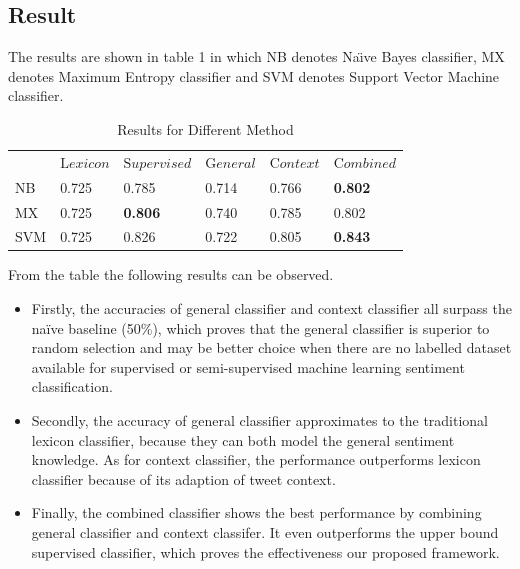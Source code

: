 \documentclass{llncs}
\begin{document}
\subsection{Result}
The results are shown in table 1 in which NB denotes Na\"\i ve Bayes classifier, MX denotes Maximum Entropy classifier and SVM denotes Support Vector Machine classifier. 
\begin{table}
\caption{Results for Different Method}
\begin{center}
\renewcommand{\arraystretch}{1.4}
\setlength\tabcolsep{3pt}
\begin{tabular}{llllll}
\hline\noalign{\bigskip}
   & ${\mathrm Lexicon}$ & ${\mathrm Supervised}$ & 
  ${\mathrm General}$ & ${\mathrm Context}$ & ${\mathrm Combined}$ \\
\noalign{\bigskip}
\hline
\noalign{\bigskip}
 NB & 0.725 & 0.785 & 0.714 & 0.766 & \textbf{0.802}   \\
 MX & 0.725 & \textbf{0.806} & 0.740 & 0.785 & 0.802  \\
 SVM & 0.725 & 0.826 & 0.722 & 0.805 & \textbf{0.843} \\
\hline
\end{tabular}
\end{center}
\end{table}
From the table the following results can be observed.
\begin{itemize}
\item Firstly, the accuracies of general classifier and context classifier all surpass the naïve baseline (50\%), which proves that the general classifier is superior to random selection and may be better choice when there are no labelled dataset available for supervised or semi-supervised machine learning sentiment classification.
\item Secondly, the accuracy of general classifier approximates to the traditional lexicon classifier, because they can both model the general sentiment knowledge. 
As for context classifier, the performance outperforms lexicon classifier because of its adaption of tweet context.
\item Finally, the combined classifier shows the best performance by combining general classifier and context classifer. 
It even outperforms the upper bound supervised classifier, which proves the effectiveness our proposed framework.
\end{itemize}
\end{document}
